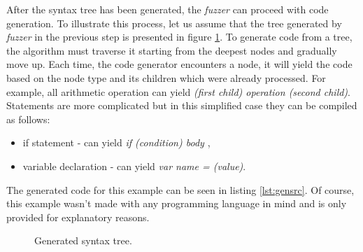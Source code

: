 After the syntax tree has been generated, the \textit{fuzzer} can proceed with code generation. To illustrate this process, let us assume that the tree generated by \textit{fuzzer} in the previous step is presented in figure \ref{fig:gentree}. To generate code from a tree, the algorithm must traverse it starting from the deepest nodes and gradually move up. Each time, the code generator encounters a node, it will yield the code based on the node type and its children which were already processed. For example, all arithmetic operation can yield \textit{(first child) operation (second child)}. Statements are more complicated but in this simplified case they can be compiled as follows:
\begin{itemize}
    \item if statement - can yield \textit{if (condition) { body }},
    \item variable declaration - can yield \textit{var name = (value)}.
\end{itemize}
The generated code for this example can be seen in listing \ref{lst:gensrc}. Of course, this example wasn't made with any programming language in mind and is only provided for explanatory reasons.

\begin{figure}[h!]
    \centering

    
    \caption{Generated syntax tree.}
    \label{fig:gentree}
\end{figure}

